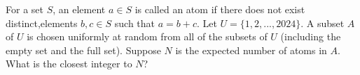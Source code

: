 For a set $S$, an element $a \in S$ is called an atom if there does not exist distinct,elements $b, c \in S$ such that $a = b+c$. Let $U = \{1, 2,..., 2024\}$. A subset $A$ of $U$ is chosen uniformly at random from all of the subsets of $U$ (including the empty set and the full set). Suppose $N$ is the expected number of atoms in $A$. What is the closest integer to $N$?
